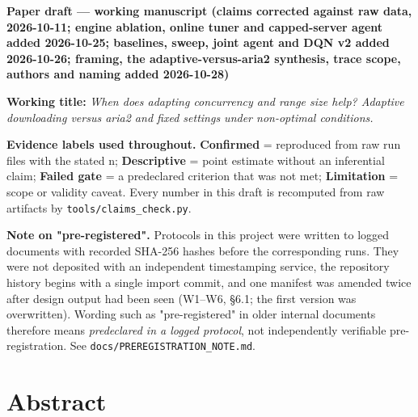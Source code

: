 \documentclass[10pt,a4paper]{article}
\begin{document}
{\sffamily\large\bfseries Paper draft — working manuscript (claims corrected against raw data, 2026-10-11; engine ablation, online tuner and capped-server agent added 2026-10-25; baselines, sweep, joint agent and DQN v2 added 2026-10-26; framing, the adaptive-versus-aria2 synthesis, trace scope, authors and naming added 2026-10-28)\par}\medskip

\textbf{Working title:} \emph{When does adapting concurrency and range size help? Adaptive downloading versus aria2 and fixed settings under non-optimal conditions.}


\textbf{Evidence labels used throughout.} \textbf{Confirmed} = reproduced from raw run files with the stated n; \textbf{Descriptive} = point estimate without an inferential claim; \textbf{Failed gate} = a predeclared criterion that was not met; \textbf{Limitation} = scope or validity caveat. Every number in this draft is recomputed from raw artifacts by \texttt{tools/\allowbreak{}claims\_check.py}.


\textbf{Note on "pre-registered".} Protocols in this project were written to logged documents with recorded SHA-256 hashes before the corresponding runs. They were not deposited with an independent timestamping service, the repository history begins with a single import commit, and one manifest was amended twice after design output had been seen (W1–W6, §6.1; the first version was overwritten). Wording such as "pre-registered" in older internal documents therefore means \emph{predeclared in a logged protocol}, not independently verifiable pre-registration. See \texttt{docs/\allowbreak{}PREREGISTRATION\_NOTE.md}.



\section*{Abstract}
\end{document}
